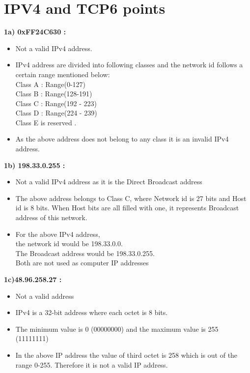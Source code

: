 \documentclass{resources/WeSTassignment}
\begin{document}
\section{IPV4 and TCP\hfill{6 points}}
\textbf{1a) 0xFF24C630 :}  
\begin{itemize}
               \item Not a valid IPv4 address.
               \item IPv4 address are divided into following classes and the network id follows a certain range mentioned below: \\ Class A : Range(0-127)\\ Class B : Range(128-191) \\ Class C : Range(192 - 223) \\ Class D : Range(224 - 239) \\ Class E is reserved .
               \item As the above address does not belong to any class it is an invalid IPv4 address.
            \end{itemize}
\textbf{1b) 198.33.0.255 :}
            \begin{itemize}
			\item Not a valid IPv4 address as it is the Direct Broadcast address
            \item The above address belongs to Class C, where Network id is 27 bits and Host id is 8 bits. When Host bits are all filled with one, it represents Broadcast address of this network. 
            \item For the above IPv4 address,\\the network id would be 198.33.0.0.\\The Broadcast address would be 198.33.0.255.\\
            Both are not used as computer IP addresses
            \end{itemize}
\textbf{1c)48.96.258.27 :}
            \begin{itemize}
            \item  Not a valid address
            \item IPv4 is a 32-bit address where each octet is 8 bits.
            \item The minimum value is 0 (00000000) and the maximum value is 255 (11111111)
            \item In the above IP address the value of third octet is 258 which is out of the range 0-255. Therefore it is not a valid IP address.
            \end{itemize}
\end{document}
